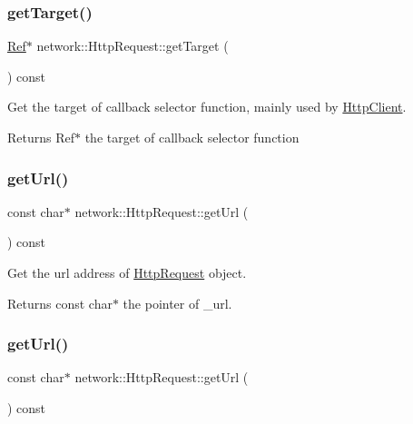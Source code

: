 \subsubsection{\texorpdfstring{get\+Target()}{getTarget()}\hspace{0.1cm}{\footnotesize\ttfamily [2/2]}}
{\footnotesize\ttfamily \hyperlink{classRef}{Ref}$\ast$ network\+::\+Http\+Request\+::get\+Target (\begin{DoxyParamCaption}{ }\end{DoxyParamCaption}) const\hspace{0.3cm}{\ttfamily [inline]}}

Get the target of callback selector function, mainly used by \hyperlink{classnetwork_1_1HttpClient}{Http\+Client}.

\begin{DoxyReturn}{Returns}
Ref$\ast$ the target of callback selector function 
\end{DoxyReturn}
\mbox{\label{classnetwork_1_1HttpRequest_a9379bae7239cf005675dfbec1db0134f}} 
\subsubsection{\texorpdfstring{get\+Url()}{getUrl()}\hspace{0.1cm}{\footnotesize\ttfamily [1/2]}}
{\footnotesize\ttfamily const char$\ast$ network\+::\+Http\+Request\+::get\+Url (\begin{DoxyParamCaption}{ }\end{DoxyParamCaption}) const\hspace{0.3cm}{\ttfamily [inline]}}

Get the url address of \hyperlink{classnetwork_1_1HttpRequest}{Http\+Request} object.

\begin{DoxyReturn}{Returns}
const char$\ast$ the pointer of \+\_\+url. 
\end{DoxyReturn}
\mbox{\label{classnetwork_1_1HttpRequest_a9379bae7239cf005675dfbec1db0134f}} 
\subsubsection{\texorpdfstring{get\+Url()}{getUrl()}\hspace{0.1cm}{\footnotesize\ttfamily [2/2]}}
{\footnotesize\ttfamily const char$\ast$ network\+::\+Http\+Request\+::get\+Url (\begin{DoxyParamCaption}{ }\end{DoxyParamCaption}) const\hspace{0.3cm}{\ttfamily [inline]}}

